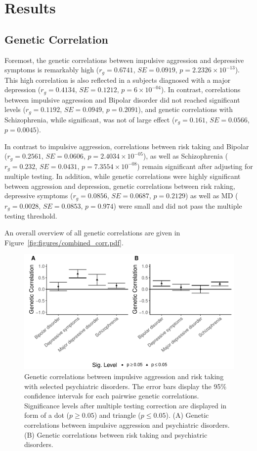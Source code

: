 \section{Results}
\label{sec:results}

\subsection{Genetic Correlation}
\label{sub:psych_genetic_correlation}

Foremost, the genetic correlations between impulsive aggression and depressive symptoms is remarkably high ($r_g=0.6741$, $SE=0.0919$, $p=2.2326\times 10^{-13}$).
This high correlation is also reflected in a subjects diagnosed with a major depression ($r_g=0.4134$, $SE=0.1212$, $p=6\times 10^{-04}$).
In contrast, correlations between impulsive aggression and Bipolar disorder did not reached significant levels ($r_g=0.1192$, $SE=0.0949$, $p=0.2091$), and genetic correlations with Schizophrenia, while significant, was not of large effect ($r_g=0.161$, $SE=0.0566$, $p=0.0045$).

In contrast to impulsive aggression, correlations between risk taking and Bipolar ($r_g=0.2561$, $SE=0.0606$, $p=2.4034\times 10^{-05}$), as well as Schizophrenia ($r_g=0.232$, $SE=0.0431$, $p=7.3554\times 10^{-08}$) remain significant after adjusting for multiple testing.
In addition, while genetic correlations were highly significant between aggression and depression, genetic correlations between risk raking, depressive symptoms ($r_g=0.0856$, $SE=0.0687$, $p=0.2129$) as well as MD ($r_g=0.0028$, $SE=0.0853$, $p=0.974$) were small and did not pass the multiple testing threshold.

An overall overview of all genetic correlations are given in Figure~\ref{fig:figures/combined_corr.pdf}.

\begin{figure}[htpb]
  \centering
  \includegraphics[width=0.8\linewidth]{figures/combined_corr.pdf}
  \caption{Genetic correlations between impulsive aggression and risk taking with selected psychiatric disorders.
    The error bars display the 95\% confidence intervals for each pairwise genetic correlations.
    Significance levels after multiple testing correction are displayed in form of a dot ($p\ge 0.05$) and triangle ($p\leq0.05$).
    (A) Genetic correlations between impulsive aggression and psychiatric disorders. 
    (B) Genetic correlations between risk taking and psychiatric disorders.
  }\label{fig:figures/combined_corr}
\end{figure}


